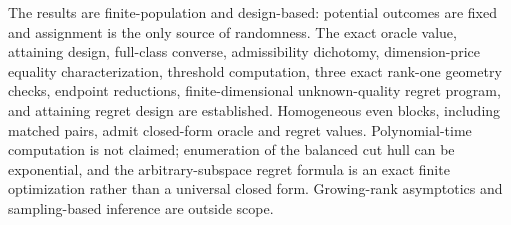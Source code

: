 The results are finite-population and design-based: potential outcomes are fixed and assignment is the only source of randomness. The exact oracle value, attaining design, full-class converse, admissibility dichotomy, dimension-price equality characterization, threshold computation, three exact rank-one geometry checks, endpoint reductions, finite-dimensional unknown-quality regret program, and attaining regret design are established. Homogeneous even blocks, including matched pairs, admit closed-form oracle and regret values. Polynomial-time computation is not claimed; enumeration of the balanced cut hull can be exponential, and the arbitrary-subspace regret formula is an exact finite optimization rather than a universal closed form. Growing-rank asymptotics and sampling-based inference are outside scope.